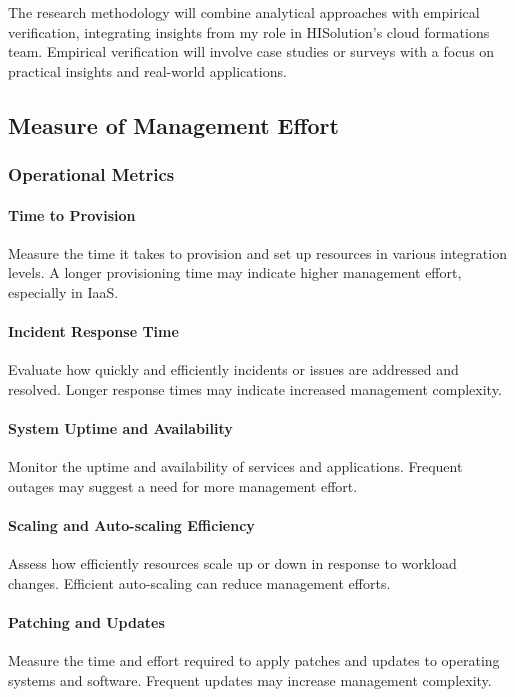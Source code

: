 The research methodology will combine analytical approaches with empirical verification, 
integrating insights from my role in HISolution's cloud formations team. 
Empirical verification will involve case studies or surveys with a focus on practical insights and real-world applications.


\subsection{Measure of Management Effort}

\subsubsection{Operational Metrics}

\paragraph{Time to Provision}
Measure the time it takes to provision and set up resources in various integration levels. 
A longer provisioning time may indicate higher management effort, especially in IaaS.

\paragraph{Incident Response Time}
Evaluate how quickly and efficiently incidents or issues are addressed and resolved. 
Longer response times may indicate increased management complexity.

\paragraph{System Uptime and Availability}

Monitor the uptime and availability of services and applications. 
Frequent outages may suggest a need for more management effort.

\paragraph{Scaling and Auto-scaling Efficiency}

Assess how efficiently resources scale up or down in response to workload changes. 
Efficient auto-scaling can reduce management efforts.

\paragraph{Patching and Updates}
Measure the time and effort required to apply patches and updates to operating systems and software. 
Frequent updates may increase management complexity.

